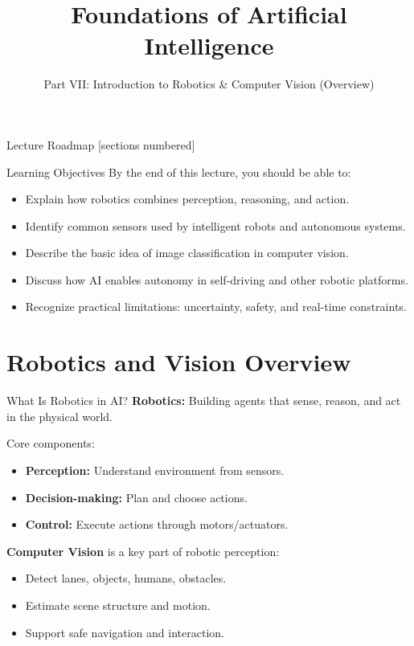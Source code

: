\documentclass[10pt]{beamer}
\title{Foundations of Artificial Intelligence}
\subtitle{Part VII: Introduction to Robotics \& Computer Vision (Overview)}
\institute{Department of Computer Science}
\date{}
\begin{document}
\maketitle

\begin{frame}{Lecture Roadmap}
    [sections numbered]
    \tableofcontents[hideallsubsections]
\end{frame}

\begin{frame}{Learning Objectives}
    By the end of this lecture, you should be able to:
    \begin{itemize}
        \item Explain how robotics combines perception, reasoning, and action.
        \item Identify common sensors used by intelligent robots and autonomous systems.
        \item Describe the basic idea of image classification in computer vision.
        \item Discuss how AI enables autonomy in self-driving and other robotic platforms.
        \item Recognize practical limitations: uncertainty, safety, and real-time constraints.
    \end{itemize}
\end{frame}

\section{Robotics and Vision Overview}

\begin{frame}{What Is Robotics in AI?}
    \textbf{Robotics:} Building agents that sense, reason, and act in the physical world.

    \vspace{0.2cm}
    Core components:
    \begin{itemize}
        \item \textbf{Perception:} Understand environment from sensors.
        \item \textbf{Decision-making:} Plan and choose actions.
        \item \textbf{Control:} Execute actions through motors/actuators.
    \end{itemize}

    \vspace{0.2cm}
    \textbf{Computer Vision} is a key part of robotic perception:
    \begin{itemize}
        \item Detect lanes, objects, humans, obstacles.
        \item Estimate scene structure and motion.
        \item Support safe navigation and interaction.
    \end{itemize}
\end{frame}
\end{document}
